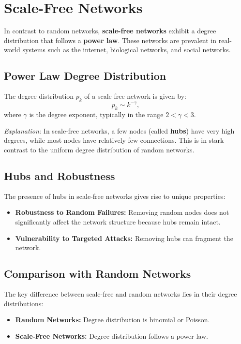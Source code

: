 \documentclass{article}
\begin{document}
\section{Scale-Free Networks}
In contrast to random networks, \textbf{scale-free networks} exhibit a degree distribution that follows a \textbf{power law}. These networks are prevalent in real-world systems such as the internet, biological networks, and social networks.

\subsection{Power Law Degree Distribution}
The degree distribution $p_k$ of a scale-free network is given by:
\begin{equation}
    p_k \sim k^{-\gamma},
\end{equation}
where $\gamma$ is the degree exponent, typically in the range $2 < \gamma < 3$.

\textit{Explanation:} In scale-free networks, a few nodes (called \textbf{hubs}) have very high degrees, while most nodes have relatively few connections. This is in stark contrast to the uniform degree distribution of random networks.

\subsection{Hubs and Robustness}
The presence of hubs in scale-free networks gives rise to unique properties:
\begin{itemize}
    \item \textbf{Robustness to Random Failures:} Removing random nodes does not significantly affect the network structure because hubs remain intact.
    \item \textbf{Vulnerability to Targeted Attacks:} Removing hubs can fragment the network.
\end{itemize}

\subsection{Comparison with Random Networks}
The key difference between scale-free and random networks lies in their degree distributions:
\begin{itemize}
    \item \textbf{Random Networks:} Degree distribution is binomial or Poisson.
    \item \textbf{Scale-Free Networks:} Degree distribution follows a power law.
\end{itemize}
\end{document}
